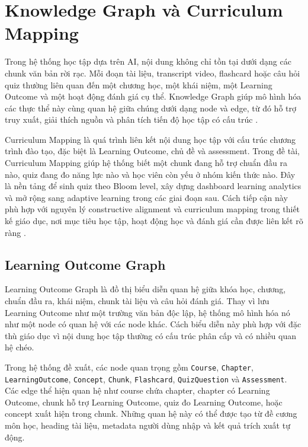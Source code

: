 \section{Knowledge Graph và Curriculum Mapping}
\label{sec:knowledge-graph-curriculum-mapping}

Trong hệ thống học tập dựa trên AI, nội dung không chỉ tồn tại dưới dạng các
chunk văn bản rời rạc. Mỗi đoạn tài liệu, transcript video, flashcard hoặc câu
hỏi quiz thường liên quan đến một chương học, một khái niệm, một Learning
Outcome và một hoạt động đánh giá cụ thể. Knowledge Graph giúp mô hình hóa các
thực thể này cùng quan hệ giữa chúng dưới dạng node và edge, từ đó hỗ trợ truy
xuất, giải thích nguồn và phân tích tiến độ học tập có cấu trúc
\cite{hogan2021knowledgegraphs}.

Curriculum Mapping là quá trình liên kết nội dung học tập với cấu trúc chương
trình đào tạo, đặc biệt là Learning Outcome, chủ đề và assessment. Trong đề tài,
Curriculum Mapping giúp hệ thống biết một chunk đang hỗ trợ chuẩn đầu ra nào,
quiz đang đo năng lực nào và học viên còn yếu ở nhóm kiến thức nào. Đây là nền
tảng để sinh quiz theo Bloom level, xây dựng dashboard learning analytics và mở
rộng sang adaptive learning trong các giai đoạn sau. Cách tiếp cận này phù hợp
với nguyên lý constructive alignment và curriculum mapping trong thiết kế giáo
dục, nơi mục tiêu học tập, hoạt động học và đánh giá cần được liên kết rõ ràng
\cite{biggs1996constructive,harden2001curriculum}.

\subsection{Learning Outcome Graph}
\label{subsec:learning-outcome-graph}

Learning Outcome Graph là đồ thị biểu diễn quan hệ giữa khóa học, chương, chuẩn
đầu ra, khái niệm, chunk tài liệu và câu hỏi đánh giá. Thay vì lưu Learning
Outcome như một trường văn bản độc lập, hệ thống mô hình hóa nó như một node có
quan hệ với các node khác. Cách biểu diễn này phù hợp với đặc thù giáo dục vì
nội dung học tập thường có cấu trúc phân cấp và có nhiều quan hệ chéo.

Trong hệ thống đề xuất, các node quan trọng gồm \texttt{Course},
\texttt{Chapter}, \texttt{LearningOutcome}, \texttt{Concept}, \texttt{Chunk},
\texttt{Flashcard}, \texttt{QuizQuestion} và \texttt{Assessment}. Các edge thể
hiện quan hệ như course chứa chapter, chapter có Learning Outcome, chunk hỗ trợ
Learning Outcome, quiz đo Learning Outcome, hoặc concept xuất hiện trong chunk.
Những quan hệ này có thể được tạo từ đề cương môn học, heading tài liệu, metadata
người dùng nhập và kết quả trích xuất tự động.

